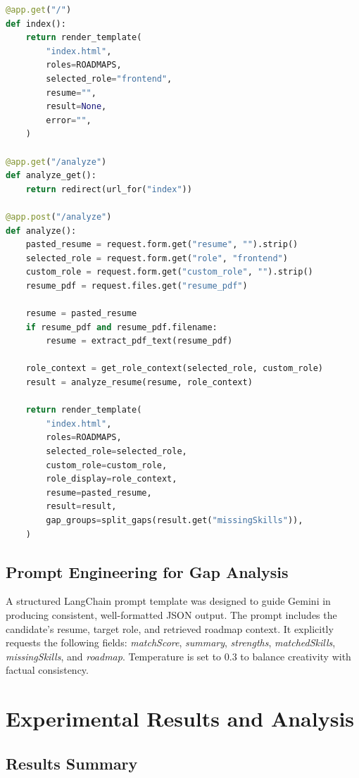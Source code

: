 \documentclass[12pt,a4paper]{report}
\begin{document}
\begin{lstlisting}[language=Python, caption={Main Flask routes in app.py.}]
@app.get("/")
def index():
    return render_template(
        "index.html",
        roles=ROADMAPS,
        selected_role="frontend",
        resume="",
        result=None,
        error="",
    )

@app.get("/analyze")
def analyze_get():
    return redirect(url_for("index"))

@app.post("/analyze")
def analyze():
    pasted_resume = request.form.get("resume", "").strip()
    selected_role = request.form.get("role", "frontend")
    custom_role = request.form.get("custom_role", "").strip()
    resume_pdf = request.files.get("resume_pdf")

    resume = pasted_resume
    if resume_pdf and resume_pdf.filename:
        resume = extract_pdf_text(resume_pdf)

    role_context = get_role_context(selected_role, custom_role)
    result = analyze_resume(resume, role_context)

    return render_template(
        "index.html",
        roles=ROADMAPS,
        selected_role=selected_role,
        custom_role=custom_role,
        role_display=role_context,
        resume=pasted_resume,
        result=result,
        gap_groups=split_gaps(result.get("missingSkills")),
    )
\end{lstlisting}

\section{Prompt Engineering for Gap Analysis}

A structured LangChain prompt template was designed to guide Gemini in producing
consistent, well-formatted JSON output. The prompt includes the candidate's
resume, target role, and retrieved roadmap context. It explicitly requests the
following fields: \textit{matchScore}, \textit{summary}, \textit{strengths},
\textit{matchedSkills}, \textit{missingSkills}, and \textit{roadmap}. Temperature
is set to 0.3 to balance creativity with factual consistency.

\chapter{Experimental Results and Analysis}

\section{Results Summary}
\end{document}
